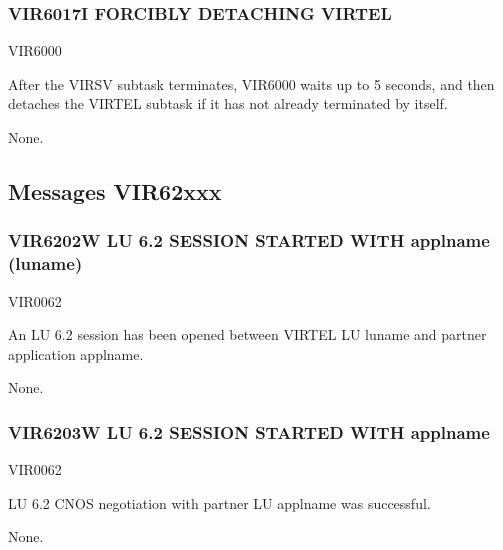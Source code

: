 \documentclass[letterpaper,10pt,english]{sphinxmanual}
\begin{document}
\subsubsection{VIR6017I FORCIBLY DETACHING VIRTEL}
\label{\detokenize{messages:vir6017i-forcibly-detaching-virtel}}\begin{description}
\sphinxAtStartPar
VIR6000

\sphinxAtStartPar
After the VIRSV subtask terminates, VIR6000 waits up to 5 seconds, and then detaches the VIRTEL subtask if it has not already terminated by itself.

\sphinxAtStartPar
None.

\end{description}


\subsection{Messages VIR62xxx}
\label{\detokenize{messages:messages-vir62xxx}}

\subsubsection{VIR6202W LU 6.2 SESSION STARTED WITH applname (luname)}
\label{\detokenize{messages:vir6202w-lu-6-2-session-started-with-applname-luname}}\begin{description}
\sphinxAtStartPar
VIR0062

\sphinxAtStartPar
An LU 6.2 session has been opened between VIRTEL LU luname and partner application applname.

\sphinxAtStartPar
None.

\end{description}


\subsubsection{VIR6203W LU 6.2 SESSION STARTED WITH applname}
\label{\detokenize{messages:vir6203w-lu-6-2-session-started-with-applname}}\begin{description}
\sphinxAtStartPar
VIR0062

\sphinxAtStartPar
LU 6.2 CNOS negotiation with partner LU applname was successful.

\sphinxAtStartPar
None.

\end{description}
\end{document}
